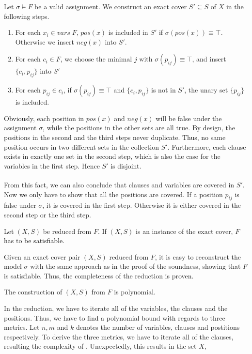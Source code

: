 Let $\sigma \models F$ be a valid assignment. We construct an exact cover $S' \subseteq S$ of $X$ in the following steps.
\begin{enumerate}
    \item For each $x_i \in vars\; F$, $pos(x)$ is included in $S'$ if $\sigma(pos(x)) \equiv \top$. Otherwise we insert $neg(x)$ into $S'$.
    \item For each $c_i \in F$, we choose the minimal $j$ with $\sigma(p_{ij}) \equiv \top$, and insert $\{c_i, p_{ij}\}$ into $S'$
    \item For each $p_{ij} \in c_i$, if $\sigma(p_{ij}) \equiv \top$ and $\{c_i, p_{ij}\}$ is not in $S'$, the unary set $\{p_{ij}\}$ is included. 
\end{enumerate}
Obviously, each position in $pos(x)$ and $neg(x)$ will be false under the assignment $\sigma$, 
while the positions in the other sets are all true. By design, the positions in the second and the third steps never duplicate. 
Thus, no same position occurs in two different sets in the collection $S'$. 
Furthermore, each clause exists in exactly one set in the second step, which is also the case for the variables in the first step.
Hence $S'$ is disjoint. \\\\
From this fact, we can also conclude that clauses and variables are covered in $S'$. 
Now we only have to show that all the positions are covered. If a position $p_{ij}$ is false under $\sigma$, 
it is covered in the first step. Otherwise it is either covered in the second step or the third step. 
\begin{lemma}[Completeness]
    Let $(X, S)$ be reduced from $F$. If $(X, S)$ is an instance of the exact cover, $F$ has to be satisfiable.
\end{lemma}
Given an exact cover pair $(X, S)$ reduced from $F$, it is easy to reconstruct the model $\sigma$ with the same approach as in the proof of the soundness, 
showing that $F$ is satisfiable. Thus, the completeness of the reduction is proven. 
\begin{lemma}
    The construction of $(X, S)$ from $F$ is polynomial. 
\end{lemma}
In the reduction, we have to iterate all of the variables, the clauses and the positions. 
Thus, we have to find a polynomial bound with regards to three metrics. Let $n, m$ and $k$ denotes 
the number of variables, clauses and postitions respectively. To derive the three metrics, we have to iterate 
all of the clauses, resulting the complexity of . Unexpectedly, this results in the set $X$, 
